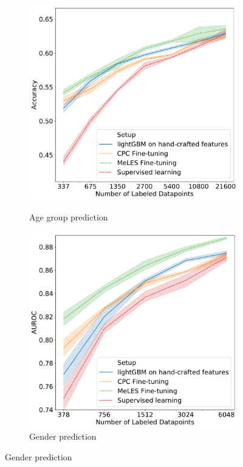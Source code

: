 \documentclass{article}
\begin{document}
\begin{figure}
  \centering
  \begin{subfigure}{0.5\linewidth}
    \caption{Age group prediction}
    \includegraphics[width=\linewidth]{figures/ss_age_pred.pdf}
    \label{fig-semi-age-0}
  \end{subfigure}%
  \begin{subfigure}{0.5\linewidth}
    \caption{Gender prediction}
    \includegraphics[width=\linewidth]{figures/ss_gen_4.pdf}

\end{subfigure}
\end{figure}
\end{document}
